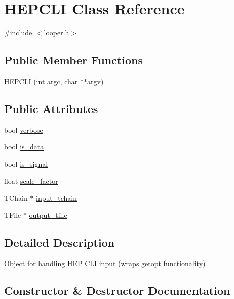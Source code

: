 \hypertarget{classHEPCLI}{}\section{H\+E\+P\+C\+LI Class Reference}
\label{classHEPCLI}


{\ttfamily \#include $<$looper.\+h$>$}

\subsection*{Public Member Functions}
\begin{DoxyCompactItemize}
\item 
\hyperlink{classHEPCLI_a5812761020c8a4401f25e4469b49f6af}{H\+E\+P\+C\+LI} (int argc, char $\ast$$\ast$argv)
\end{DoxyCompactItemize}
\subsection*{Public Attributes}
\begin{DoxyCompactItemize}
\item 
bool \hyperlink{classHEPCLI_a50592a47a23f3e33a774a747ee32bf00}{verbose}
\item 
bool \hyperlink{classHEPCLI_a1bb98769c5df4317c50d98bff38002c1}{is\+\_\+data}
\item 
bool \hyperlink{classHEPCLI_ae1d563a29c5a238e0469442bad714e6e}{is\+\_\+signal}
\item 
float \hyperlink{classHEPCLI_a027e714e73b6fcdd0cb73eb8445bbfa4}{scale\+\_\+factor}
\item 
T\+Chain $\ast$ \hyperlink{classHEPCLI_a3d4bb4a7c1f1b6d4e008ff76e43bef15}{input\+\_\+tchain}
\item 
T\+File $\ast$ \hyperlink{classHEPCLI_ab900d2e3822e20d636564874440d33f0}{output\+\_\+tfile}
\end{DoxyCompactItemize}


\subsection{Detailed Description}
Object for handling H\+EP C\+LI input (wraps getopt functionality) 

\subsection{Constructor \& Destructor Documentation}
